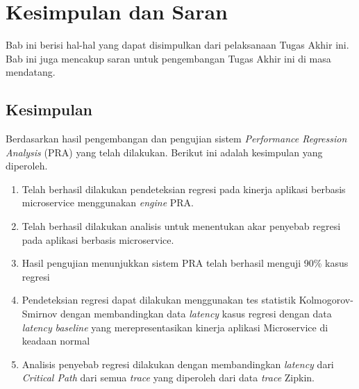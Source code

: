 \chapter{Kesimpulan dan Saran}
Bab ini berisi hal-hal yang dapat disimpulkan dari pelaksanaan Tugas Akhir ini. Bab ini juga mencakup saran untuk pengembangan Tugas Akhir ini di masa mendatang.

\section{Kesimpulan}
Berdasarkan hasil pengembangan dan pengujian sistem \textit{Performance Regression Analysis} (PRA) yang telah dilakukan. Berikut ini adalah kesimpulan yang diperoleh.
\begin{enumerate}
	\item Telah berhasil dilakukan pendeteksian regresi pada kinerja aplikasi berbasis microservice menggunakan \textit{engine} PRA.
	\item Telah berhasil dilakukan analisis untuk menentukan akar penyebab regresi pada aplikasi berbasis microservice.
	\item Hasil pengujian menunjukkan sistem PRA telah berhasil menguji 90\% kasus regresi
	\item Pendeteksian regresi dapat dilakukan menggunakan tes statistik Kolmogorov-Smirnov dengan membandingkan data \textit{latency} kasus regresi dengan data \textit{latency} \textit{baseline} yang merepresentasikan kinerja aplikasi Microservice di keadaan normal
	\item Analisis penyebab regresi dilakukan dengan membandingkan \textit{latency} dari \textit{Critical Path} dari semua \textit{trace} yang diperoleh dari data \textit{trace} Zipkin. 
	

\end{enumerate}
